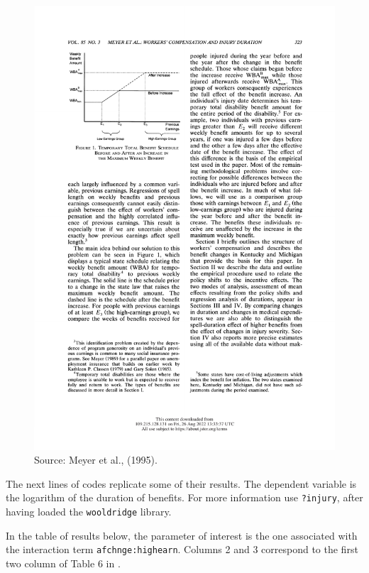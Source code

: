 \documentclass[
  12pt,
]{book}
\theoremstyle{definition}
\theoremstyle{definition}
\theoremstyle{definition}
\theoremstyle{definition}
\theoremstyle{remark}
\begin{document}
\begin{figure}

{\centering \includegraphics[width=0.9\linewidth]{images/Figure_Meyer_et_al} 

}

\caption{Source: Meyer et al., (1995).}\label{fig:figMeyer}
\end{figure}

The next lines of codes replicate some of their results. The dependent variable is the logarithm of the duration of benefits. For more information use \texttt{?injury}, after having loaded the \texttt{wooldridge} library.

In the table of results below, the parameter of interest is the one associated with the interaction term \texttt{afchnge:highearn}. Columns 2 and 3 correspond to the first two column of Table 6 in \citet{Meyer_Viscusi_Durbin_1995}.
\end{document}
